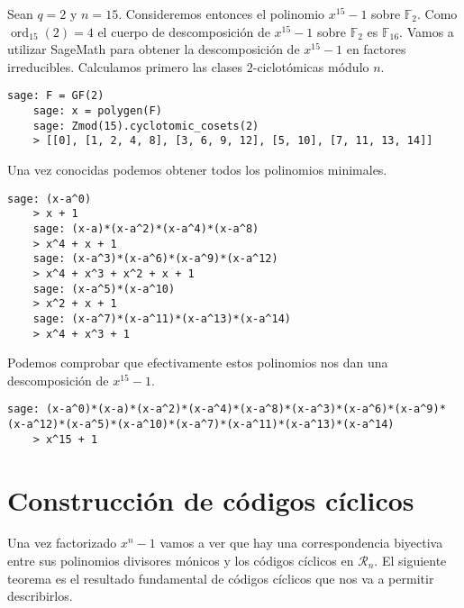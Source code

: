\begin{example}
  Sean \(q = 2\) y \(n = 15\). Consideremos entonces el polinomio \(x^{15} - 1\) sobre \(\mathbb F_2\).
  Como \(\operatorname{ord}_{15}(2) = 4\) el cuerpo de descomposición de \(x^{15} - 1\) sobre \(\mathbb F_2\) es \(\mathbb F_{16}\).
  Vamos a utilizar SageMath para obtener la descomposición de \(x^{15} - 1\) en factores irreducibles.
  Calculamos primero las clases \(2\)-ciclotómicas módulo \(n\).
  \begin{lstlisting}[gobble=4]
    sage: F = GF(2)
    sage: x = polygen(F)
    sage: Zmod(15).cyclotomic_cosets(2)
    > [[0], [1, 2, 4, 8], [3, 6, 9, 12], [5, 10], [7, 11, 13, 14]]
  \end{lstlisting}
  Una vez conocidas podemos obtener todos los polinomios minimales.
  \begin{lstlisting}[gobble=4]
    sage: (x-a^0)
    > x + 1
    sage: (x-a)*(x-a^2)*(x-a^4)*(x-a^8)
    > x^4 + x + 1
    sage: (x-a^3)*(x-a^6)*(x-a^9)*(x-a^12)
    > x^4 + x^3 + x^2 + x + 1
    sage: (x-a^5)*(x-a^10)
    > x^2 + x + 1
    sage: (x-a^7)*(x-a^11)*(x-a^13)*(x-a^14)
    > x^4 + x^3 + 1
  \end{lstlisting}
  Podemos comprobar que efectivamente estos polinomios nos dan una descomposición de \(x^{15} - 1\).
  \begin{lstlisting}[gobble=4]
    sage: (x-a^0)*(x-a)*(x-a^2)*(x-a^4)*(x-a^8)*(x-a^3)*(x-a^6)*(x-a^9)*(x-a^12)*(x-a^5)*(x-a^10)*(x-a^7)*(x-a^11)*(x-a^13)*(x-a^14)
    > x^15 + 1
  \end{lstlisting}
\end{example}


\section{Construcción de códigos cíclicos}

Una vez factorizado \(x^n - 1\) vamos a ver que hay una correspondencia biyectiva entre sus polinomios divisores mónicos y los códigos cíclicos en \(\mathcal R_n\).
El siguiente teorema es el resultado fundamental de códigos cíclicos que nos va a permitir describirlos.

